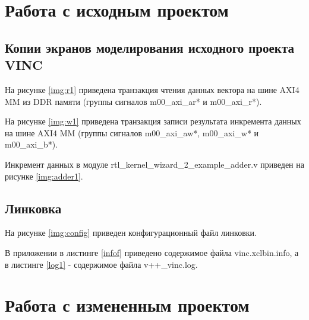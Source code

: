 \chapter{Работа с исходным проектом}


\section{Копии экранов моделирования исходного проекта VINC}

На рисунке \ref{img:r1} приведена транзакция чтения данных вектора на шине AXI4 MM из DDR памяти (группы сигналов m00\_axi\_ar* и m00\_axi\_r*).


На рисунке \ref{img:w1} приведена транзакция записи результата инкремента данных на шине AXI4 MM (группы сигналов m00\_axi\_aw*, m00\_axi\_w* и m00\_axi\_b*).


	
Инкремент данных в модуле  rtl\_kernel\_wizard\_2\_example\_adder.v приведен на рисунке \ref{img:adder1}.

\clearpage
{}


\section{Линковка}

На рисунке \ref{img:config} приведен конфигурационный файл линковки.




В приложении в листинге \ref{infof} приведено содержимое файла vinc.xclbin.info, а в листинге \ref{log1} - содержимое файла v++\_vinc.log.



\chapter{Работа с измененным проектом}


